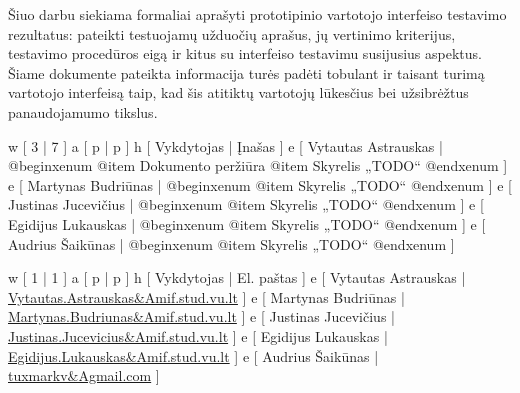 
Šiuo darbu siekiama formaliai aprašyti prototipinio vartotojo interfeiso testavimo
rezultatus: pateikti testuojamų užduočių aprašus, jų vertinimo kriterijus, testavimo
procedūros eigą ir kitus su interfeiso testavimu susijusius aspektus. 
Šiame dokumente pateikta informacija turės padėti tobulant ir taisant turimą
vartotojo interfeisą taip, kad šis atitiktų vartotojų lūkesčius bei užsibrėžtus
panaudojamumo tikslus.

\xtable
{
  w [ 3  | 7 ]
  a [ p  | p ]
  h [ Vykdytojas | Įnašas ]
  e [ Vytautas Astrauskas
  | @begin{xenum} 
      @item Dokumento peržiūra
      @item Skyrelis „TODO“
    @end{xenum}
  ]
  e [ Martynas Budriūnas
  | @begin{xenum} 
      @item Skyrelis „TODO“
    @end{xenum}
  ]
  e [ Justinas Jucevičius 
  | @begin{xenum} 
      @item Skyrelis „TODO“
    @end{xenum}
  ]
  e [ Egidijus Lukauskas 
  | @begin{xenum} 
      @item Skyrelis „TODO“
    @end{xenum}
  ]
  e [ Audrius Šaikūnas 
  | @begin{xenum} 
      @item Skyrelis „TODO“
    @end{xenum}
  ]
}

\xtableu
{
  w [ 1 | 1 ]
  a [ p | p ]
  h [ Vykdytojas | El. paštas ]
  e [ Vytautas Astrauskas | \url{Vytautas.Astrauskas&Amif.stud.vu.lt} ]
  e [ Martynas Budriūnas  | \url{Martynas.Budriunas&Amif.stud.vu.lt} ]
  e [ Justinas Jucevičius | \url{Justinas.Jucevicius&Amif.stud.vu.lt} ]
  e [ Egidijus Lukauskas  | \url{Egidijus.Lukauskas&Amif.stud.vu.lt} ]
  e [ Audrius Šaikūnas    | \url{tuxmarkv&Agmail.com} ]
}
